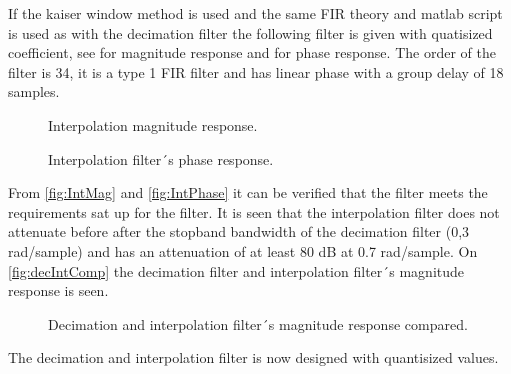 If the kaiser window method is used and the same FIR theory and matlab script is used as with the decimation filter the following filter is given with quatisized coefficient, see for magnitude response and for phase response. The order of the filter is 34, it is a type 1 FIR filter and has linear phase with a group delay of 18 samples.

\begin{figure}[H]
	\centering
	
	\caption{Interpolation magnitude response.}
	\label{fig:IntMag}
\end{figure}

\begin{figure}[H]
	\centering
	
	\caption{Interpolation filter´s phase response.}
	\label{fig:IntPhase}
\end{figure}

From \autoref{fig:IntMag} and \autoref{fig:IntPhase} it can be verified that the filter meets the requirements sat up for the filter. It is seen that the interpolation filter does not attenuate before after the stopband bandwidth of the decimation filter (0,3 rad/sample) and has an attenuation of at least 80 dB at 0.7 rad/sample. On \autoref{fig:decIntComp} the decimation filter and interpolation filter´s magnitude response is seen.  

\begin{figure}[H]
	\centering
	
	\caption{Decimation and interpolation filter´s magnitude response compared.}
	\label{fig:decIntComp}
\end{figure}

The decimation and interpolation filter is now designed with quantisized values. %